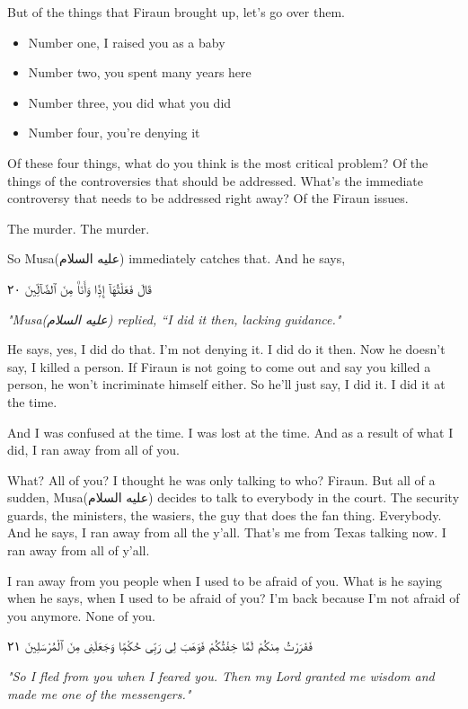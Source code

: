 \documentclass[12pt]{article}
\newcommand{\as}{\textarabic{(عليه السلام)}}
\begin{document}
But of the things that Firaun brought up, let's go over them. 

\begin{itemize}
    \item Number one, I raised you as a baby
    \item Number two, you spent many years here
    \item Number three, you did what you did
    \item Number four, you're denying it
\end{itemize}

Of these four things, what do you think is the most critical problem? Of the things of the controversies that should be addressed. What's the immediate controversy that needs to be addressed right away? Of the Firaun issues. 

The murder. The murder. 

So Musa\as{} immediately catches that. And he says, 

\textarabic{قَالَ فَعَلْتُهَآ إِذًۭا وَأَنَا۠ مِنَ ٱلضَّآلِّينَ ٢٠} 

\textit{"Musa\as{} replied, “I did it then, lacking guidance."}

He says, yes, I did do that. I'm not denying it. I did do it then. Now he doesn't say, I killed a person. If Firaun is not going to come out and say you killed a person, he won't incriminate himself either. So he'll just say, I did it. I did it at the time. 

And I was confused at the time. I was lost at the time. And as a result of what I did, I ran away from all of you. 

What? All of you? I thought he was only talking to who? Firaun. But all of a sudden, Musa\as{} decides to talk to everybody in the court. The security guards, the ministers, the wasiers, the guy that does the fan thing. Everybody. And he says, I ran away from all the y'all. That's me from Texas talking now. I ran away from all of y'all. 

I ran away from you people when I used to be afraid of you. What is he saying when he says, when I used to be afraid of you? I'm back because I'm not afraid of you anymore. None of you. 

\textarabic{فَفَرَرْتُ مِنكُمْ لَمَّا خِفْتُكُمْ فَوَهَبَ لِى رَبِّى حُكْمًۭا وَجَعَلَنِى مِنَ ٱلْمُرْسَلِينَ ٢١}

\textit{"So I fled from you when I feared you. Then my Lord granted me wisdom and made me one of the messengers."}
\end{document}
